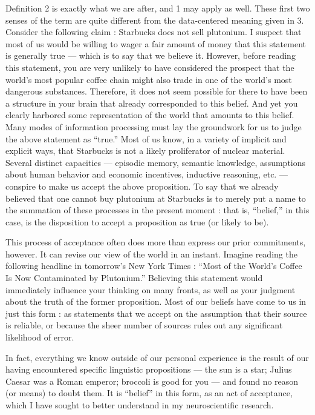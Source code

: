 \documentclass[a4paper,14pt]{extarticle}
\begin{document}
Definition 2 is exactly what we are after, and 1 may apply as well.
These first two senses of the term are quite different from the data-centered meaning given in 3.
Consider the following claim :
Starbucks does not sell plutonium.
I suspect that most of us would be willing to wager a fair amount of money that this statement is generally true --- which is to say that we believe it.
However, before reading this statement, you are very unlikely to have considered the prospect that the world’s most popular coffee chain might also trade in one of the world’s most dangerous substances.
Therefore, it does not seem possible for there to have been a structure in your brain that already corresponded to this belief.
And yet you clearly harbored some representation of the world that amounts to this belief.
Many modes of information processing must lay the groundwork for us to judge the above statement as ``true.''
Most of us know, in a variety of implicit and explicit ways, that Starbucks is not a likely proliferator of nuclear material.
Several distinct capacities --- episodic memory, semantic knowledge, assumptions about human behavior and economic incentives, inductive reasoning, etc. --- conspire to make us accept the above proposition.
To say that we already believed that one cannot buy plutonium at Starbucks is to merely put a name to the summation of these processes in the present moment :
that is, ``belief,'' in this case, is the disposition to accept a proposition as true (or likely to be).

This process of acceptance often does more than express our prior commitments, however.
It can revise our view of the world in an instant.
Imagine reading the following headline in tomorrow’s New York Times :
``Most of the World’s Coffee Is Now Contaminated by Plutonium.''
Believing this statement would immediately influence your thinking on many fronts, as well as your judgment about the truth of the former proposition.
Most of our beliefs have come to us in just this form :
as statements that we accept on the assumption that their source is reliable, or because the sheer number of sources rules out any significant likelihood of error.

In fact, everything we know outside of our personal experience is the result of our having encountered specific linguistic propositions --- the sun is a star;
Julius Caesar was a Roman emperor;
broccoli is good for you --- and found no reason (or means) to doubt them.
It is ``belief'' in this form, as an act of acceptance, which I have sought to better understand in my neuroscientific research.
\end{document}
